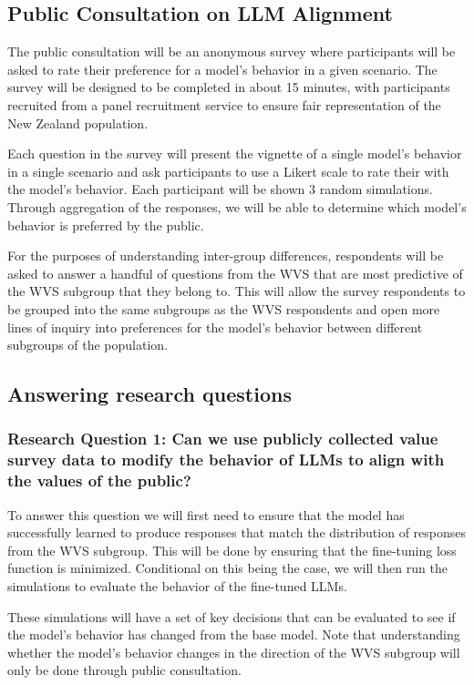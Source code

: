 \documentclass[11pt, a4paper]{article}
\begin{document}
\subsection{Public Consultation on LLM Alignment}

The public consultation will be an anonymous survey where participants will be asked to rate their preference for a model's behavior in a given scenario. The survey will be designed to be completed in about 15 minutes, with participants recruited from a panel recruitment service to ensure fair representation of the New Zealand population.

Each question in the survey will present the vignette of a single model's behavior in a single scenario and ask participants to use a Likert scale to rate their  with the model's behavior. Each participant will be shown 3 random simulations. Through aggregation of the responses, we will be able to determine which model's behavior is preferred by the public. 

For the purposes of understanding inter-group differences, respondents will be asked to answer a handful of questions from the WVS that are most predictive of the WVS subgroup that they belong to. This will allow the survey respondents to be grouped into the same subgroups as the WVS respondents and open more lines of inquiry into preferences for the model's behavior between different subgroups of the population.

\subsection{Answering research questions}

\subsubsection{Research Question 1: Can we use publicly collected value survey data to modify the behavior of LLMs to align with the values of the public?}

To answer this question we will first need to ensure that the model has successfully learned to produce responses that match the distribution of responses from the WVS subgroup. This will be done by ensuring that the fine-tuning loss function is minimized. Conditional on this being the case, we will then run the simulations to evaluate the behavior of the fine-tuned LLMs.

These simulations will have a set of key decisions that can be evaluated to see if the model's behavior has changed from the base model. Note that understanding whether the model's behavior changes in the direction of the WVS subgroup will only be done through public consultation.
\end{document}
